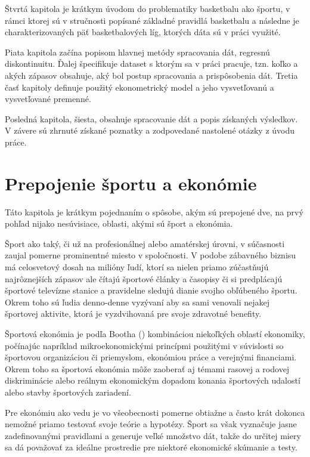 \documentclass[
  digital, %
  oneside, %
  notable,   %
  lof,     %
  lot,     %
]{fithesis3}
\begin{document}
	Štvrtá kapitola je krátkym úvodom do problematiky basketbalu ako športu, v rámci ktorej sú v stručnosti popísané základné pravidlá basketbalu a následne je charakterizovaných päť basketbalových líg, ktorých dáta sú v práci využité.
	
	Piata kapitola začína popisom hlavnej metódy spracovania dát, regresnú diskontinuitu. Ďalej špecifikuje dataset s ktorým sa v práci pracuje, tzn. koľko a akých zápasov obsahuje, aký bol postup spracovania a prispôsobenia dát. Tretia časť kapitoly definuje použitý ekonometrický model a jeho vysvetľovanú a vysvetľované premenné.
	
	Posledná kapitola, šiesta, obsahuje spracovanie dát a popis získaných výsledkov. V závere sú zhrnuté získané poznatky a zodpovedané nastolené otázky z úvodu práce.
	

	\chapter{Prepojenie športu a ekonómie}
	Táto kapitola je krátkym pojednaním o spôsobe, akým sú prepojené dve, na prvý pohľad nijako nesúvisiace, oblasti, akými sú šport a ekonómia.
	
	Šport ako taký, či už na profesionálnej alebo amatérskej úrovni, v súčasnosti zaujal pomerne prominentné miesto v spoločnosti. V podobe zábavného biznisu má celosvetový dosah na milióny ľudí, ktorí sa nielen priamo zúčastňujú najrôznejších zápasov ale čítajú športové články a časopisy či si predplácajú športové televízne stanice a pravidelne sledujú dianie svojho obľúbeného športu. \parencite{conrad2011} Okrem toho sú ľudia denno-denne vyzývaní aby sa sami venovali nejakej športovej aktivite, ktorá je vyzdvihovaná pre svoje zdravotné benefity.
	
	Športová ekonómia je podľa Bootha (\citeyear{booth2009}) kombináciou niekoľkých oblastí ekonomiky, počínajúc napríklad mikroekonomickými princípmi použitými v súvislosti so športovou organizáciou či priemyslom, ekonómiou práce a verejnými financiami. Okrem toho sa športová ekonómia môže zaoberať aj témami rasovej a rodovej diskriminácie alebo reálnym ekonomickým dopadom konania športových udalostí alebo stavby športových zariadení. 
	
	Pre ekonómiu ako vedu je vo všeobecnosti pomerne obtiažne a často krát dokonca nemožné  priamo testovať svoje teórie a hypotézy. Šport sa však vyznačuje jasne zadefinovanými pravidlami a generuje veľké množstvo dát, takže do určitej miery sa dá považovať za ideálne prostredie pre niektoré ekonomické skúmanie a testy.
	
\end{document}
